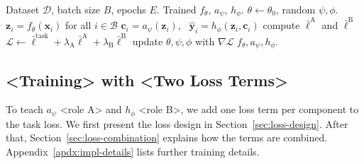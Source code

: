 \begin{algorithm}[t]
  \captionsetup{labelformat=default,labelsep=colon,name=Algorithm}  %
  \caption{Training with X}
  \label{alg:method}
\begin{algorithmic}
   Dataset $\mathcal{D}$, batch size $B$, epochs $E$.
   Trained $f_\theta$, $a_\psi$, $h_\phi$.
   $\theta \leftarrow \theta_{0}$, random $\psi, \phi$.
      \STATE $\mathbf{z}_{i} = f_\theta(\mathbf{x}_{i})$ for all $i \in \mathcal{B}$
      \STATE {}
      \STATE $\mathbf{c}_{i} = a_\psi(\mathbf{z}_{i})$, \ $\hat{\mathbf{y}}_{i} = h_\phi(\mathbf{z}_{i}, \mathbf{c}_{i})$
      \STATE compute $\bar{\ell}^{\text{A}}$ and $\bar{\ell}^{\text{B}}$ 
      \STATE $\mathcal{L} \leftarrow \bar{\ell}^{\text{task}} + \lambda_{\text{A}}\bar{\ell}^{\text{A}} + \lambda_{\text{B}}\bar{\ell}^{\text{B}}$
      \STATE update $\theta, \psi, \phi$ with $\nabla \mathcal{L}$
    \ENDFOR
  \ENDFOR
   $f_\theta, a_\psi, h_\phi$.
\end{algorithmic}
\end{algorithm}

\subsection{<Training> with <Two Loss Terms>} \label{sec:training}
To teach $a_\psi$ <role A> and $h_\phi$ <role B>, we add one loss term per component to the task loss.
We first present the loss design in Section~\ref{sec:loss-design}.
After that, Section~\ref{sec:loss-combination} explains how the terms are combined.
Appendix~\ref{apdx:impl-details} lists further training details.

